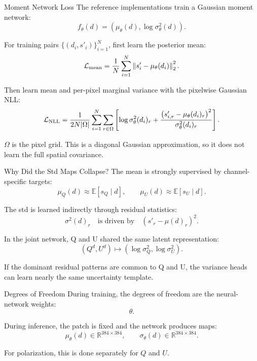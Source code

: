 \documentclass[10pt,aspectratio=169]{beamer}
\newcommand{\data}{d}
\newcommand{\synth}{s'}
\newcommand{\net}{f_\theta}
\begin{document}
\begin{frame}{Moment Network Loss}
  The reference implementations train a Gaussian moment network:
  \[
    \net(\data) =
    \left(
      \mu_\theta(\data),
      \log \sigma_\theta^2(\data)
    \right).
  \]

  For training pairs \(\{(\data_i,\synth_i)\}_{i=1}^N\), first learn the posterior mean:
  \[
    \mathcal{L}_{\rm mean}
    =
    \frac{1}{N}
    \sum_{i=1}^{N}
    \left\|
      \synth_i - \mu_\theta(\data_i)
    \right\|_2^2 .
  \]

  Then learn mean and per-pixel marginal variance with the pixelwise Gaussian NLL:
  \[
    \mathcal{L}_{\rm NLL}
    =
    \frac{1}{2N|\Omega|}
    \sum_{i=1}^{N}
    \sum_{r \in \Omega}
    \left[
      \log \sigma_\theta^2(\data_i)_r
      +
      \frac{
        \left(\synth_{i,r} - \mu_\theta(\data_i)_r\right)^2
      }{
        \sigma_\theta^2(\data_i)_r
      }
    \right].
  \]

  \(\Omega\) is the pixel grid. This is a diagonal Gaussian approximation, so it does not learn the full spatial covariance.
\end{frame}

\begin{frame}{Why Did the Std Maps Collapse?}
  The mean is strongly supervised by channel-specific targets:
  \[
    \mu_Q(d) \approx \mathbb{E}[s_Q \mid d],
    \qquad
    \mu_U(d) \approx \mathbb{E}[s_U \mid d].
  \]

  \vspace{0.4em}
  The std is learned indirectly through residual statistics:
  \[
    \sigma^2(d)_r
    \quad\text{is driven by}\quad
    \left(s'_r-\mu(d)_r\right)^2 .
  \]

  \vspace{0.4em}
  In the joint network, Q and U shared the same latent representation:
  \[
    (Q^d,U^d)
    \longmapsto
    (\log\sigma_Q^2,\log\sigma_U^2).
  \]

  If the dominant residual patterns are common to Q and U, the variance heads can learn nearly the same uncertainty template.
\end{frame}

\begin{frame}{Degrees of Freedom}
  During training, the degrees of freedom are the neural-network weights:
  \[
    \theta.
  \]

  \vspace{0.5em}
  During inference, the patch is fixed and the network produces maps:
  \[
    \mu_\theta(\data) \in \mathbb{R}^{384 \times 384},
    \qquad
    \sigma_\theta(\data) \in \mathbb{R}^{384 \times 384}.
  \]

  \vspace{0.5em}
  For polarization, this is done separately for \(Q\) and \(U\).
\end{frame}
\end{document}
